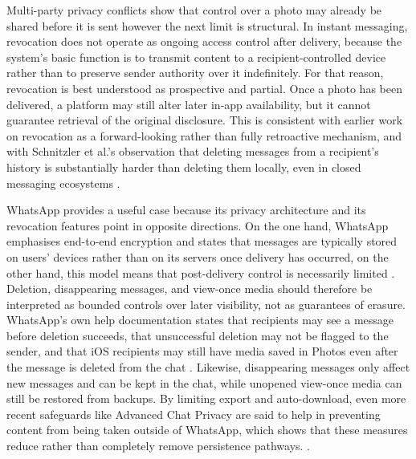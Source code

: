 Multi-party privacy conflicts show that control over a photo may already be shared before it is sent however the next limit is structural. In instant messaging, revocation does not operate as ongoing access control after delivery, because the system’s basic function is to transmit content to a recipient-controlled device rather than to preserve sender authority over it indefinitely. For that reason, revocation is best understood as prospective and partial. Once a photo has been delivered, a platform may still alter later in-app availability, but it cannot guarantee retrieval of the original disclosure. This is consistent with earlier work on revocation as a forward-looking rather than fully retroactive mechanism, and with Schnitzler et al.’s observation that deleting messages from a recipient’s history is substantially harder than deleting them locally, even in closed messaging ecosystems \cite{politou_2018, schnitzler_2020}.

WhatsApp provides a useful case because its privacy architecture and its revocation features point in opposite directions. On the one hand, WhatsApp emphasises end-to-end encryption and states that messages are typically stored on users’ devices rather than on its servers once delivery has occurred, on the other hand, this model means that post-delivery control is necessarily limited \cite{whatsapp_e2e_encryption}. Deletion, disappearing messages, and view-once media should therefore be interpreted as bounded controls over later visibility, not as guarantees of erasure. WhatsApp’s own help documentation states that recipients may see a message before deletion succeeds, that unsuccessful deletion may not be flagged to the sender, and that iOS recipients may still have media saved in Photos even after the message is deleted from the chat \cite{whatsapp_delete_messages}. Likewise, disappearing messages only affect new messages and can be kept in the chat, while unopened view-once media can still be restored from backups. By limiting export and auto-download, even more recent safeguards like Advanced Chat Privacy are said to help in preventing content from being taken outside of WhatsApp, which shows that these measures reduce rather than completely remove persistence pathways. \cite{whatsapp_disappearing_messages, whatsapp_view_once, whatsapp_advanced_chat_privacy, whatsapp_advanced_chat_privacy_blog_2025}.

